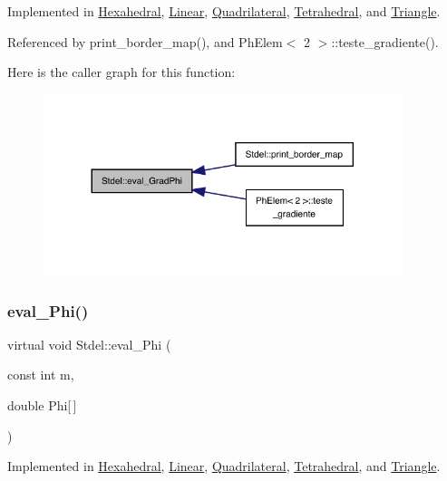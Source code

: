 Implemented in \hyperlink{classHexahedral_a74909a28bef5ee2b4de02d571061fed8}{Hexahedral}, \hyperlink{classLinear_aaaecdabce48e08e1ae342646a7340c32}{Linear}, \hyperlink{classQuadrilateral_a36182bade5a366259a236faa2061d8cb}{Quadrilateral}, \hyperlink{classTetrahedral_a6dfb6e6d44f3b5c1127e893e14a759d0}{Tetrahedral}, and \hyperlink{classTriangle_a123dce9963455a2c5d932f677f3405f7}{Triangle}.



Referenced by print\+\_\+border\+\_\+map(), and Ph\+Elem$<$ 2 $>$\+::teste\+\_\+gradiente().

Here is the caller graph for this function\+:
\nopagebreak
\begin{figure}[H]
\begin{center}
\leavevmode
\includegraphics[width=296pt]{classStdel_a83a7a53e4be6da7c3a615967e4504b07_icgraph}
\end{center}
\end{figure}
\mbox{\label{classStdel_a2aa6ea12ceaa1fa4a7f63909ce41bc0b}} 
\subsubsection{\texorpdfstring{eval\+\_\+\+Phi()}{eval\_Phi()}}
{\footnotesize\ttfamily virtual void Stdel\+::eval\+\_\+\+Phi (\begin{DoxyParamCaption}\item[{const int}]{m,  }\item[{double}]{Phi\mbox{[}$\,$\mbox{]} }\end{DoxyParamCaption})\hspace{0.3cm}{\ttfamily [pure virtual]}}



Implemented in \hyperlink{classHexahedral_ae26647440a5b8a60d0f7075435acfe44}{Hexahedral}, \hyperlink{classLinear_a46fd7278a34a6b665e7ab469a244ce1e}{Linear}, \hyperlink{classQuadrilateral_a90d47786b93b255c1c777f0d35eddccb}{Quadrilateral}, \hyperlink{classTetrahedral_ac0dec119fa6faa28f52ca8416e0214b2}{Tetrahedral}, and \hyperlink{classTriangle_a871ac2a2f38f1c9f8f36a6cc4bd1eef5}{Triangle}.



